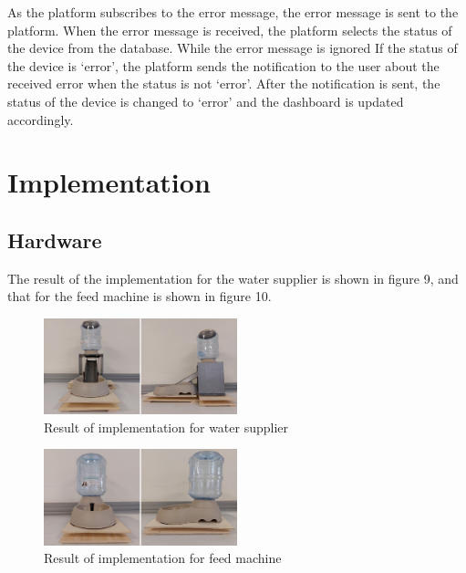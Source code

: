 \documentclass[conference]{IEEEtran}
\begin{document}
As the platform subscribes to the error message, the error message is sent to the platform. When the error message is received, the platform selects the status of the device from the database. While the error message is ignored If the status of the device is ‘error’, the platform sends the notification to the user about the received error when the status is not ‘error’. After the notification is sent, the status of the device is changed to ‘error’ and the dashboard is updated accordingly.

\section{Implementation}

\subsection{Hardware}
The result of the implementation for the water supplier is shown in figure 9, and that for the feed machine is shown in figure 10.

\begin{figure}[htbp]
\centerline{\includegraphics[width=0.5\textwidth]{./images/Water Supplier.jpg}}
\caption{Result of implementation for water supplier}
\label{fig}
\end{figure}

\begin{figure}[htbp]
\centerline{\includegraphics[width=0.5\textwidth]{./images/Feed Machine.jpg}}
\caption{Result of implementation for feed machine}
\label{fig}
\end{figure}
\end{document}
